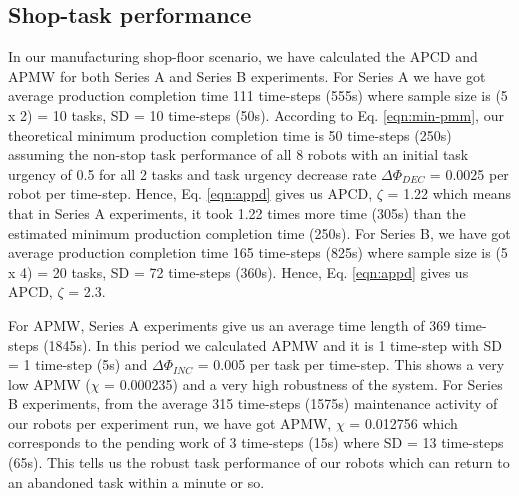 \documentclass[smallcondensed]{svjour3}
\begin{document}
\subsection*{Shop-task performance}
In our manufacturing shop-floor scenario, we have calculated the APCD and APMW for both Series A and Series B experiments. For Series A we have got  average production completion time 111 time-steps (555s) where sample size is (5 x 2) = 10 tasks, SD = 10 time-steps (50s). According to Eq. \ref{eqn:min-pmm}, our theoretical minimum production completion time is 50 time-steps (250s) assuming the non-stop task performance of all 8 robots with an initial task urgency of 0.5 for all 2 tasks and task urgency decrease rate $\Delta \Phi_{DEC }$ = 0.0025 per robot per time-step.  Hence, Eq. \ref{eqn:appd} gives us APCD, $\zeta$ = 1.22 which means that in Series A experiments, it took 1.22 times more time (305s) than the estimated minimum production completion time (250s). For Series B, we have got average production completion time 165 time-steps (825s) where sample size is (5 x 4) = 20 tasks, SD = 72 time-steps (360s).  Hence, Eq. \ref{eqn:appd} gives us APCD, $\zeta$ = 2.3.

For APMW, Series A experiments give us an average time length of 369 time-steps (1845s).  In this period we calculated APMW and it is 1 time-step with SD = 1 time-step (5s) and $\Delta \Phi_{INC}$ = 0.005 per task per time-step. This shows a very low APMW ($\chi$ = 0.000235) and a very high robustness of the system. For Series B experiments, from the average 315 time-steps (1575s) maintenance activity of our robots per experiment run, we have got APMW, $\chi$ = 0.012756 which corresponds to the pending work of 3 time-steps (15s) where SD = 13 time-steps (65s). This tells us the robust task performance of our robots which can return to an abandoned task within a minute or so.
\end{document}
